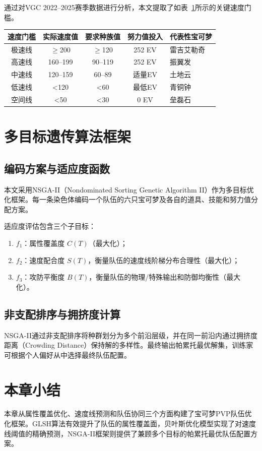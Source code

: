 通过对VGC 2022--2025赛季数据进行分析，本文提取了如表~\ref{tab:speed-tiers}所示的关键速度门槛。

\begin{table}[!htbp]
    \label{tab:speed-tiers}
    \centering
    \footnotesize
    \begin{tabular}{ccccl}
        \hline
        速度门槛 & 实际速度值 & 要求种族值 & 努力值投入 & 代表性宝可梦 \\
        \hline
        极速线 & $\geq$200 & $\geq$120 & 252 EV & 雷吉艾勒奇 \\
        高速线 & 160--199 & 90--119 & 252 EV & 振翼发 \\
        中速线 & 120--159 & 60--89 & 适量EV & 土地云 \\
        低速线 & <120 & <60 & 最低EV & 青铜钟 \\
        空间线 & <50 & <30 & 0 EV & 垒磊石 \\
        \hline
    \end{tabular}
\end{table}

\section{多目标遗传算法框架}

\subsection{编码方案与适应度函数}

本文采用NSGA-II（Nondominated Sorting Genetic Algorithm II）作为多目标优化框架。每一条染色体编码一个队伍的六只宝可梦及各自的道具、技能和努力值分配方案。

适应度评估包含三个子目标：
\begin{enumerate}
    \item $f_1$：属性覆盖度 $C(T)$（最大化）；
    \item $f_2$：速度配合度 $S(T)$，衡量队伍的速度线阶梯分布合理性（最大化）；
    \item $f_3$：攻防平衡度 $B(T)$，衡量队伍的物理/特殊输出和防御均衡性（最大化）。
\end{enumerate}

\subsection{非支配排序与拥挤度计算}

NSGA-II通过非支配排序将种群划分为多个前沿层级，并在同一前沿内通过拥挤度距离（Crowding Distance）保持解的多样性。最终输出帕累托最优解集，训练家可根据个人偏好从中选择最终队伍配置。

\section{本章小结}

本章从属性覆盖优化、速度线预测和队伍协同三个方面构建了宝可梦PVP队伍优化框架。GLSH算法有效提升了队伍的属性覆盖面，贝叶斯优化模型实现了对速度线阈值的精确预测，NSGA-II框架则提供了兼顾多个目标的帕累托最优队伍配置方案。
